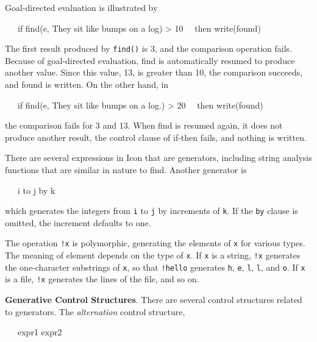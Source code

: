 Goal-directed evaluation is illustrated by

{\ttfamily\mdseries
\ \ \ if find({\textquotedbl}e{\textquotedbl}, {\textquotedbl}They sit like bumps on a log{\textquotedbl})
{\textgreater} 10\newline
 \ \ then write({\textquotedbl}found{\textquotedbl})}

The first result produced by \texttt{find()} is 3, and the comparison
operation fails. Because of goal-directed evaluation, find is
automatically resumed to produce another value. Since this value, 13,
is greater than 10, the comparison succeeds, and found is written. On
the other hand, in

{\ttfamily\mdseries
\ \ \ if find({\textquotedbl}e{\textquotedbl}, {\textquotedbl}They sit like bumps on a log.{\textquotedbl})
{\textgreater} 20\newline
 \ \ then write({\textquotedbl}found{\textquotedbl})}

\noindent the comparison fails for 3 and 13. When find is resumed
again, it does not produce another result, the control clause of
if-then fails, and nothing is written.

There are several expressions in Icon that are generators, including
string analysis functions that are similar in nature to find. Another
generator is

{\ttfamily\mdseries
\ \ \ i to j by k}

which generates the integers from \texttt{i} to \texttt{j} by
increments of \texttt{k}. If the \texttt{by} clause is omitted, the
increment defaults to one.

The operation \texttt{!x} is polymorphic, generating the elements of
\texttt{x} for various types. The meaning of
{\textquotedbl}element{\textquotedbl} depends on the type of
\texttt{x}. If \texttt{x} is a string, \texttt{!x} generates the
one-character substrings of \texttt{x}, so that
\texttt{!{\textquotedbl}hello{\textquotedbl}} generates
\texttt{{\textquotedbl}h{\textquotedbl}},
\texttt{{\textquotedbl}e{\textquotedbl}},
\texttt{{\textquotedbl}l{\textquotedbl}},
\texttt{{\textquotedbl}l{\textquotedbl}}, and
\texttt{{\textquotedbl}o{\textquotedbl}}. If \texttt{x} is a file,
\texttt{!x} generates the lines of the file, and so on.


\textbf{Generative Control Structures}. There are several control
structures related to generators. The \textit{alternation} control
structure,

{\ttfamily\mdseries
\ \ \ expr1 {\textbar} expr2}

